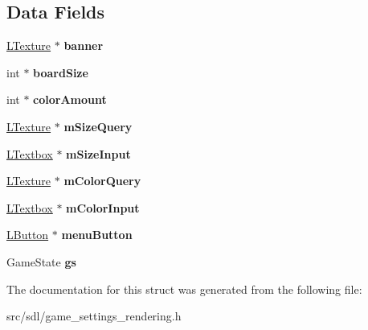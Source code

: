 \subsection*{Data Fields}
\begin{DoxyCompactItemize}
\item 
\mbox{\label{structsettings_screen_a068d01584474022d1049f78565d551f9}} 
\hyperlink{structtexture}{L\+Texture} $\ast$ {\bfseries banner}
\item 
\mbox{\label{structsettings_screen_a672a362d05743dccdde0fec4e95156f8}} 
int $\ast$ {\bfseries board\+Size}
\item 
\mbox{\label{structsettings_screen_ac21e6b079e5191b7a42f90096b6d213e}} 
int $\ast$ {\bfseries color\+Amount}
\item 
\mbox{\label{structsettings_screen_a166b9c7b6f9424d5d22a7c5306c24d01}} 
\hyperlink{structtexture}{L\+Texture} $\ast$ {\bfseries m\+Size\+Query}
\item 
\mbox{\label{structsettings_screen_a720b673a2957e44d181b85a28f04eba4}} 
\hyperlink{structtextbox}{L\+Textbox} $\ast$ {\bfseries m\+Size\+Input}
\item 
\mbox{\label{structsettings_screen_ab4a50251d5ca99b28a59dd5e0fb43e83}} 
\hyperlink{structtexture}{L\+Texture} $\ast$ {\bfseries m\+Color\+Query}
\item 
\mbox{\label{structsettings_screen_ac950a41138dc6610dfa1e0dcc6ca46a9}} 
\hyperlink{structtextbox}{L\+Textbox} $\ast$ {\bfseries m\+Color\+Input}
\item 
\mbox{\label{structsettings_screen_abd981fb6e197d0155c00e3bc92703198}} 
\hyperlink{structbutton}{L\+Button} $\ast$ {\bfseries menu\+Button}
\item 
\mbox{\label{structsettings_screen_a326ac0832310ae96cbae0f489eedac92}} 
Game\+State {\bfseries gs}
\end{DoxyCompactItemize}


The documentation for this struct was generated from the following file\+:\begin{DoxyCompactItemize}
\item 
src/sdl/game\+\_\+settings\+\_\+rendering.\+h\end{DoxyCompactItemize}
